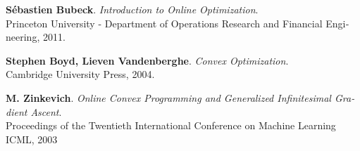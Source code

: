 

\newcommand{\bibauthors}[1]{\textbf{#1}}
\newcommand{\bibtitle}[1]{\textit{#1}}
\newcommand{\bibpublication}[1]{\textnormal{#1}}


\begin{thebibliography}{9}
\begin{latin}

\bibauthors{ S\'ebastien Bubeck}. 
\bibtitle{Introduction to Online Optimization}.\\
\bibpublication{Princeton University - Department of Operations Research and Financial Engineering, 2011.}

\bibauthors{Stephen Boyd, Lieven Vandenberghe}. 
\bibtitle{Convex Optimization}.\\
\bibpublication{Cambridge University Press, 2004.}


\bibauthors{M. Zinkevich}. 
\bibtitle{Online Convex Programming and Generalized Infinitesimal Gradient Ascent}.\\
\bibpublication{Proceedings of the Twentieth International Conference on Machine Learning ICML, 2003}


 

\end{latin}
\end{thebibliography}